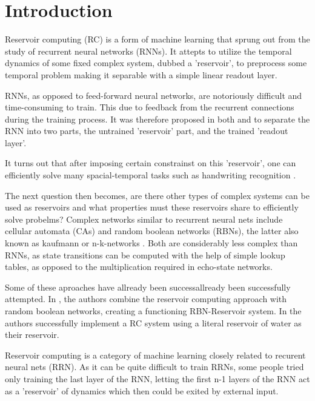 \section{Introduction}

Reservoir computing (RC) is a form of machine learning that sprung out from the study of recurrent neural networks (RNNs).
It attepts to utilize the temporal dynamics of some fixed complex system, dubbed a 'reservoir',
to preprocess some temporal problem making it separable with a simple linear readout layer.

RNNs, as opposed to feed-forward neural networks,
are notoriously difficult and time-consuming to train.
This due to feedback from the recurrent connections during the training process.
It was therefore proposed in both  and 
to separate the RNN into two parts, the untrained 'reservoir' part, and the trained 'readout layer'.

It turns out that after imposing certain constrainst on this 'reservoir',
one can efficiently solve many spacial-temporal tasks such as handwriting recognition .

The next question then becomes, are there other types of complex systems can be used as reservoirs
and what properties must these reservoirs share to efficiently solve probelms?
Complex networks similar to recurrent neural nets include cellular automata (CAs) and random boolean networks (RBNs), the latter also known as kaufmann or n-k-networks .
Both are considerably less complex than RNNs, as state transitions can be computed with the help of simple lookup tables, as opposed to the multiplication required in echo-state networks.

Some of these aproaches have allready been successallready been successfully attempted.
In \cite{reservoir-rbn}, the authors combine the reservoir computing approach with random boolean networks, creating a functioning RBN-Reservoir system.
In  the authors successfully implement a RC system using a literal reservoir of water as their reservoir.



Reservoir computing is a category of machine learning closely related to recurent neural nets (RRN).
As it can be quite difficult to train RRNs, some people \cite{liquidstatepaper} \cite{echostatenetworkpaper} tried only training the last layer of the RNN,
letting the first n-1 layers of the RNN act as a 'reservoir' of dynamics which then could be exited by external input.

